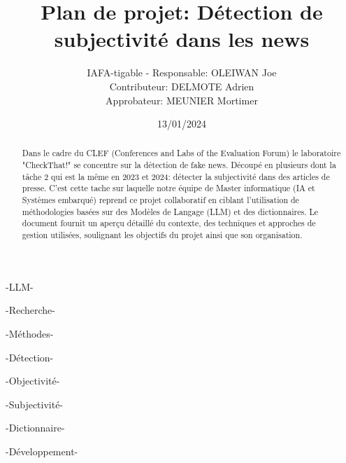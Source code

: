 \documentclass[11pt]{rapport_class}
\title{Plan de projet: Détection de subjectivité dans les news}
\author{IAFA-tigable - Responsable: OLEIWAN Joe \\ Contributeur: DELMOTE Adrien \\ Approbateur: MEUNIER Mortimer}
\date{13/01/2024}
\begin{document}
\maketitle

\begin{abstract}
Dans le cadre du CLEF (Conferences and Labs of the Evaluation Forum) le laboratoire "CheckThat!" se concentre sur la détection de fake news. Découpé en plusieurs dont la tâche 2 qui est la même en 2023 et 2024: détecter la subjectivité dans des articles de presse. C'est cette tache sur laquelle notre équipe de Master informatique (IA et Systèmes embarqué) reprend ce projet collaboratif en ciblant l'utilisation de méthodologies basées sur des Modèles de Langage (LLM) et des dictionnaires. Le document fournit un aperçu détaillé du contexte, des techniques et approches de gestion utilisées, soulignant les objectifs du projet ainsi que son organisation.
\end{abstract}

\smallskip
\begin{motsclefs}
\smallskip
\centerline{-LLM-}
\centerline{-Recherche-}
\centerline{-Méthodes-}
\centerline{-Détection-}
\centerline{-Objectivité-}
\centerline{-Subjectivité-}
\centerline{-Dictionnaire-}
\centerline{-Développement-}
\end{motsclefs}

\tableofcontents
\end{document}
